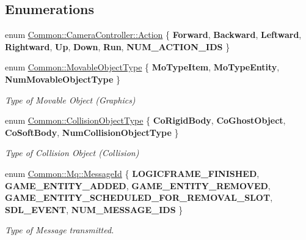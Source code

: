 \subsection*{Enumerations}
\begin{DoxyCompactItemize}
\item 
enum \hyperlink{group___common_gaf299b39b39b578b2235220e5fa8dfc01}{Common\+::\+Camera\+Controller\+::\+Action} \{ \newline
{\bfseries Forward}, 
{\bfseries Backward}, 
{\bfseries Leftward}, 
{\bfseries Rightward}, 
\newline
{\bfseries Up}, 
{\bfseries Down}, 
{\bfseries Run}, 
{\bfseries N\+U\+M\+\_\+\+A\+C\+T\+I\+O\+N\+\_\+\+I\+DS}
 \}
\item 
\mbox{\label{group___common_gaa693ad2642037f65cbba42cdc3e41636}} 
enum \hyperlink{group___common_gaa693ad2642037f65cbba42cdc3e41636}{Common\+::\+Movable\+Object\+Type} \{ {\bfseries Mo\+Type\+Item}, 
{\bfseries Mo\+Type\+Entity}, 
{\bfseries Num\+Movable\+Object\+Type}
 \}\begin{DoxyCompactList}\small\item\em Type of Movable Object (Graphics) \end{DoxyCompactList}
\item 
\mbox{\label{group___common_ga955f008a0c60257af5dc9f2a478be51f}} 
enum \hyperlink{group___common_ga955f008a0c60257af5dc9f2a478be51f}{Common\+::\+Collision\+Object\+Type} \{ {\bfseries Co\+Rigid\+Body}, 
{\bfseries Co\+Ghost\+Object}, 
{\bfseries Co\+Soft\+Body}, 
{\bfseries Num\+Collision\+Object\+Type}
 \}\begin{DoxyCompactList}\small\item\em Type of Collision Object (Collision) \end{DoxyCompactList}
\item 
enum \hyperlink{group___common_gaa8c87d2b450282716c906da283e149e6}{Common\+::\+Mq\+::\+Message\+Id} \{ \newline
{\bfseries L\+O\+G\+I\+C\+F\+R\+A\+M\+E\+\_\+\+F\+I\+N\+I\+S\+H\+ED}, 
{\bfseries G\+A\+M\+E\+\_\+\+E\+N\+T\+I\+T\+Y\+\_\+\+A\+D\+D\+ED}, 
{\bfseries G\+A\+M\+E\+\_\+\+E\+N\+T\+I\+T\+Y\+\_\+\+R\+E\+M\+O\+V\+ED}, 
{\bfseries G\+A\+M\+E\+\_\+\+E\+N\+T\+I\+T\+Y\+\_\+\+S\+C\+H\+E\+D\+U\+L\+E\+D\+\_\+\+F\+O\+R\+\_\+\+R\+E\+M\+O\+V\+A\+L\+\_\+\+S\+L\+OT}, 
\newline
{\bfseries S\+D\+L\+\_\+\+E\+V\+E\+NT}, 
{\bfseries N\+U\+M\+\_\+\+M\+E\+S\+S\+A\+G\+E\+\_\+\+I\+DS}
 \}\begin{DoxyCompactList}\small\item\em Type of Message transmitted. \end{DoxyCompactList}
\end{DoxyCompactItemize}


